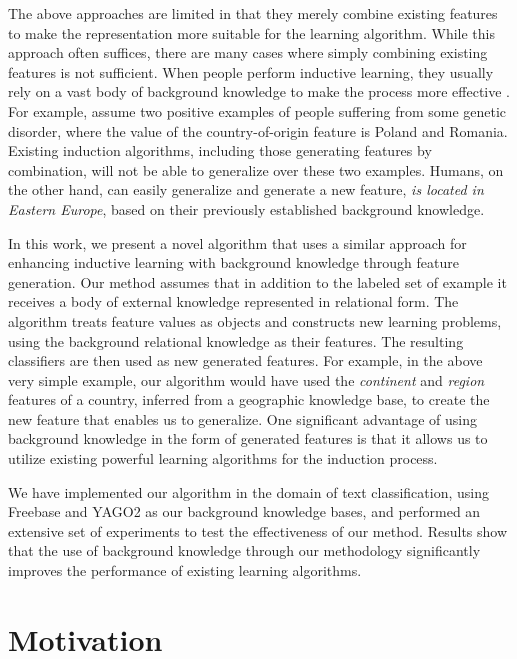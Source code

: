 \documentclass[letterpaper]{article} %
\theoremstyle{definition}
\begin{document}
The above approaches are limited in that they merely combine existing features to make the representation more suitable for the 
learning algorithm.  While this approach often suffices, there are many cases where simply combining existing features is not sufficient.
When people perform inductive learning, they usually rely on a vast body of background knowledge to make the process more
effective \cite{mcnamara1996learning}. For example, assume two positive examples of people suffering from some genetic disorder, where the 
value of the country-of-origin feature is Poland and Romania.  Existing induction algorithms, including those generating features 
by combination, will not be able to generalize over these two examples.  Humans, on the other hand, can easily generalize 
and generate a new feature, \emph{is located in Eastern Europe}, based
on their previously established background knowledge.

In this work, we present a novel algorithm that uses a similar approach for enhancing inductive learning with background knowledge through feature generation.
Our method assumes that in addition to the labeled set of example it receives a body of external knowledge represented in relational form.  The algorithm treats feature values as objects and constructs new learning problems, using the background relational knowledge as their features.  The resulting classifiers are then used as new generated features.
For example, in the above very simple example, our algorithm would have used the \emph{continent} and \emph{region} features of a country,
inferred from a geographic knowledge base, to create the new feature that enables us to generalize.  One significant advantage of
using background knowledge in the form of generated features is that it allows us to utilize existing powerful learning algorithms for the induction process.

We have implemented our algorithm in the domain of text classification, using Freebase and YAGO2 as our background knowledge bases, 
and performed an extensive set of experiments to test the effectiveness of our method.  Results show that the use of background knowledge through our methodology significantly improves the performance of existing learning algorithms.

\section{Motivation} \label{motivation}
\end{document}
